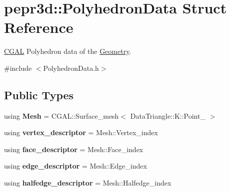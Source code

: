 \hypertarget{structpepr3d_1_1_polyhedron_data}{}\section{pepr3d\+::Polyhedron\+Data Struct Reference}
\label{structpepr3d_1_1_polyhedron_data}


\mbox{\hyperlink{namespace_c_g_a_l}{C\+G\+AL}} Polyhedron data of the \mbox{\hyperlink{classpepr3d_1_1_geometry}{Geometry}}.  




{\ttfamily \#include $<$Polyhedron\+Data.\+h$>$}

\subsection*{Public Types}
\begin{DoxyCompactItemize}
\item 
\mbox{\label{structpepr3d_1_1_polyhedron_data_ab24fbc9cbd4e66ec70b690902c64e58e}} 
using {\bfseries Mesh} = C\+G\+A\+L\+::\+Surface\+\_\+mesh$<$ Data\+Triangle\+::\+K\+::\+Point\+\_ $>$
\item 
\mbox{\label{structpepr3d_1_1_polyhedron_data_a770bd8d4c7f6212137ef585d9c521fe6}} 
using {\bfseries vertex\+\_\+descriptor} = Mesh\+::\+Vertex\+\_\+index
\item 
\mbox{\label{structpepr3d_1_1_polyhedron_data_af0ed6a9fefd99e677e7512bbcfb2f05a}} 
using {\bfseries face\+\_\+descriptor} = Mesh\+::\+Face\+\_\+index
\item 
\mbox{\label{structpepr3d_1_1_polyhedron_data_afb5116df41c91e3ceea149955fe33fed}} 
using {\bfseries edge\+\_\+descriptor} = Mesh\+::\+Edge\+\_\+index
\item 
\mbox{\label{structpepr3d_1_1_polyhedron_data_aaead5fd611681a58a77bbefeff2e30f0}} 
using {\bfseries halfedge\+\_\+descriptor} = Mesh\+::\+Halfedge\+\_\+index
\end{DoxyCompactItemize}

